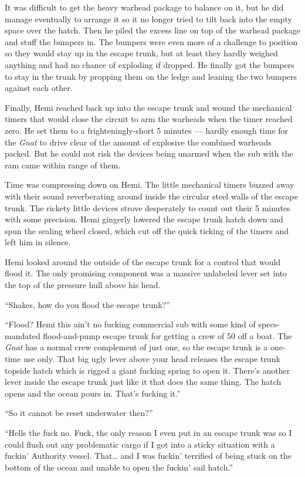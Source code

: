 \documentclass[]{scrbook}
\begin{document}
It was difficult to get the heavy warhead package to balance on it, but
he did manage eventually to arrange it so it no longer tried to tilt
back into the empty space over the hatch. Then he piled the excess line
on top of the warhead package and stuff the bumpers in. The bumpers were
even more of a challenge to position so they would stay up in the escape
trunk, but at least they hardly weighed anything and had no chance of
exploding if dropped. He finally got the bumpers to stay in the trunk by
propping them on the ledge and leaning the two bumpers against each
other.

Finally, Hemi reached back up into the escape trunk and wound the
mechanical timers that would close the circuit to arm the warheads when
the timer reached zero. He set them to a frighteningly-short 5 minutes
--- hardly enough time for the \emph{Gnat} to drive clear of the amount
of explosive the combined warheads packed. But he could not risk the
devices being unarmed when the sub with the ram came within range of
them.

Time was compressing down on Hemi. The little mechanical timers buzzed
away with their sound reverberating around inside the circular steel
walls of the escape trunk. The rickety little devices strove desperately
to count out their 5 minutes with some precision. Hemi gingerly lowered
the escape trunk hatch down and spun the sealing wheel closed, which cut
off the quick ticking of the timers and left him in silence.

Hemi looked around the outside of the escape trunk for a control that
would flood it. The only promising component was a massive unlabeled
lever set into the top of the pressure hull above his head.

``Shakes, how do you flood the escape trunk?''

``Flood? Hemi this ain't no fucking commercial sub with some kind of
specs-mandated flood-and-pump escape trunk for getting a crew of 50 off
a boat. The \emph{Gnat} has a normal crew complement of just one, so the
escape trunk is a one-time use only. That big ugly lever above your head
releases the escape trunk topside hatch which is rigged a giant fucking
spring to open it. There's another lever inside the escape trunk just
like it that does the same thing. The hatch opens and the ocean pours
in. That's fucking it.''

``So it cannot be reset underwater then?''

``Hells the fuck no. Fuck, the only reason I even put in an escape trunk
was so I could flush out any problematic cargo if I got into a sticky
situation with a fuckin' Authority vessel. That\ldots{} and I was
fuckin' terrified of being stuck on the bottom of the ocean and unable
to open the fuckin' sail hatch.''
\end{document}
